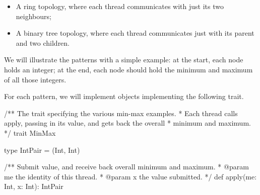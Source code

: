 \documentclass[notes,color]{sepslide0}
\begin{document}
\begin{slide}

\begin{itemize}
\item
A ring topology, where each thread communicates with just its two neighbours;
\begin{center}
\end{center}

\item
A binary tree topology, where each thread communicates just with its parent
and two children.
\begin{center}
\end{center}
\end{itemize}
\end{slide}


\begin{slide}

We will illustrate the patterns with a simple example: at the start, each
node holds an integer; at the end, each node should hold the minimum and
maximum of all those integers.

For each pattern, we will implement objects implementing the following trait. 
\begin{scala}
/** The trait specifying the various min-max examples.
  * Each thread calls apply, passing in its value, and gets back the overall
  * minimum and maximum. */
trait MinMax{
  type IntPair = (Int, Int)

  /** Submit value, and receive back overall minimum and maximum. 
    * @param me the identity of this thread.
    * @param x the value submitted. */
  def apply(me: Int, x: Int): IntPair
}
\end{scala}
\end{slide}
\end{document}
